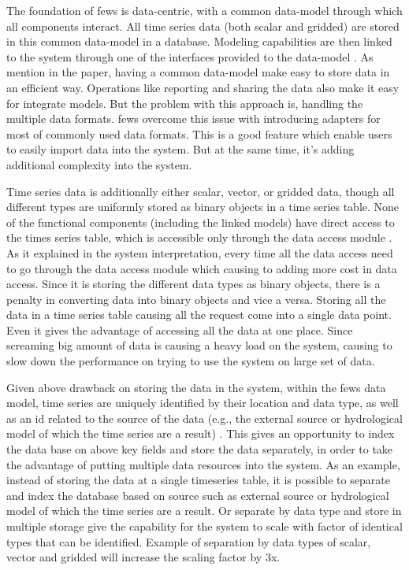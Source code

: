 The foundation of \acrshort{fews} is data-centric, with a common data-model through which all components interact. All time series data (both scalar and gridded) are stored in this common data-model in a database. Modeling capabilities are then linked to the system through one of the interfaces provided to the data-model \cite{Werner2013TheSystem}. As mention in the paper, having a common data-model make easy to store data in an efficient way. Operations like reporting and sharing the data also make it easy for integrate models. But the problem with this approach is, handling the multiple data formats. \acrshort{fews} overcome this issue with introducing adapters for most of commonly used data formats. This is a good feature which enable users to easily import data into the system. But at the same time, it's adding additional complexity into the system.

Time series data is additionally either scalar, vector, or gridded data, though all different types are uniformly stored as binary objects in a time series table. None of the functional components (including the linked models) have direct access to the times series table, which is accessible only through the data access module \cite{Werner2013TheSystem}. As it explained in the system interpretation, every time all the data access need to go through the data access module which causing to adding more cost in data access. Since it is storing the different data types as binary objects, there is a penalty in converting data into binary objects and vice a versa. Storing all the data in a time series table causing all the request come into a single data point. Even it gives the advantage of accessing all the data at one place. Since screaming big amount of data is causing a heavy load on the system, causing to slow down the performance on trying to use the system on large set of data.

Given above drawback on storing the data in the system, within the \acrshort{fews} data model, time series are uniquely identified by their location and data type, as well as an id related to the source of the data (e.g., the external source or hydrological model of which the time series are a result) \cite{Werner2013TheSystem}. This gives an opportunity to index the data base on above key fields and store the data separately, in order to take the advantage of putting multiple data resources into the system. As an example, instead of storing the data at a single timeseries table, it is possible to separate and index the database based on source such as external source or hydrological model of which the time series are a result. Or separate by data type and store in multiple storage give the capability for the system to scale with factor of identical types that can be identified. Example of separation by data types of scalar, vector and gridded will increase the scaling factor by 3x.

